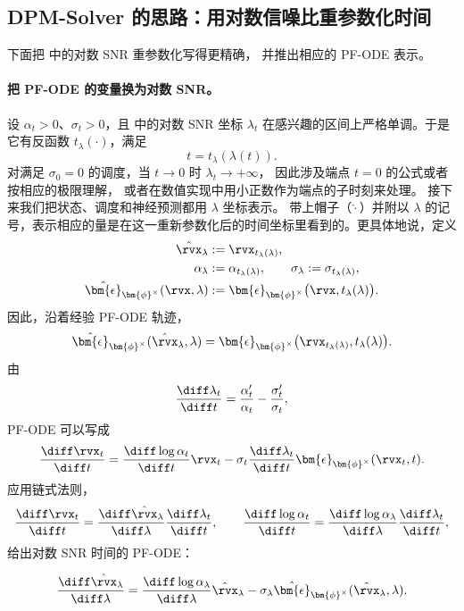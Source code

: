 \subsection{DPM-Solver 的思路：用对数信噪比重参数化时间}
\label{subsec:dpm-method}

下面把  中的对数 SNR 重参数化写得更精确，
并推出相应的 PF-ODE 表示。

\paragraph{把 PF-ODE 的变量换为对数 SNR。}
设 $\alpha_t>0$、$\sigma_t>0$，且  中的对数 SNR 坐标
$\lambda_t$ 在感兴趣的区间上严格单调。于是它有反函数
$t_\lambda(\cdot)$，满足
\[
t=t_\lambda(\lambda(t)).
\]
对满足 $\sigma_0=0$ 的调度，当 $t\to0$ 时 $\lambda_t\to+\infty$，
因此涉及端点 $t=0$ 的公式或者按相应的极限理解，
或者在数值实现中用小正数作为端点的子时刻来处理。
接下来我们把状态、调度和神经预测都用 $\lambda$ 坐标表示。
带上帽子（$\hat{\cdot}$）并附以 $\lambda$ 的记号，表示相应的量是在这一重新参数化后的时间坐标里看到的。更具体地说，定义
\begin{align}
\begin{aligned}
\label{eq:change-of-var-x-epsilon}
\hat{\rvx}_{\lambda}
&:=
\rvx_{t_\lambda(\lambda)},
\\
\alpha_\lambda
&:=
\alpha_{t_\lambda(\lambda)},
\qquad
\sigma_\lambda
:=
\sigma_{t_\lambda(\lambda)},
\\
\hat{\bm{\epsilon}}_{\bm{\phi}^\times}(\rvx,\lambda)
&:=
\bm{\epsilon}_{\bm{\phi}^\times}
\bigl(
\rvx,
t_\lambda(\lambda)
\bigr).
\end{aligned}
\end{align}
因此，沿着经验 PF-ODE 轨迹，
\[
\hat{\bm{\epsilon}}_{\bm{\phi}^\times}
(\hat\rvx_\lambda,\lambda)
=
\bm{\epsilon}_{\bm{\phi}^\times}
\bigl(
\rvx_{t_\lambda(\lambda)},
t_\lambda(\lambda)
\bigr).
\]
由
\[
\frac{\diff\lambda_t}{\diff t}
=
\frac{\alpha_t'}{\alpha_t}
-
\frac{\sigma_t'}{\sigma_t},
\]
PF-ODE  可以写成
\[
\frac{\diff\rvx_t}{\diff t}
=
\frac{\diff\log\alpha_t}{\diff t}\rvx_t
-
\sigma_t
\frac{\diff\lambda_t}{\diff t}
\bm{\epsilon}_{\bm{\phi}^\times}(\rvx_t,t).
\]
应用链式法则，
\[
\frac{\diff\rvx_t}{\diff t}
=
\frac{\diff\hat\rvx_\lambda}{\diff\lambda}
\frac{\diff\lambda_t}{\diff t},
\qquad
\frac{\diff\log\alpha_t}{\diff t}
=
\frac{\diff\log\alpha_\lambda}{\diff\lambda}
\frac{\diff\lambda_t}{\diff t},
\]
给出对数 SNR 时间的 PF-ODE：
\begin{mdframed}
\begin{align}
\label{eq:diffusion_ode_lambda_eps}
\frac{\diff\hat{\rvx}_\lambda}{\diff\lambda}
=
\frac{\diff\log\alpha_\lambda}{\diff\lambda}
\hat{\rvx}_\lambda
-
\sigma_\lambda
\hat{\bm{\epsilon}}_{\bm{\phi}^\times}
(\hat{\rvx}_\lambda,\lambda).
\end{align}
\end{mdframed}

